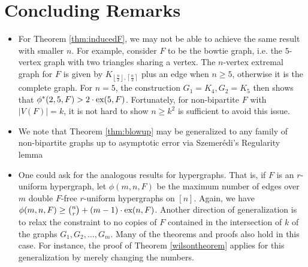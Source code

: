 \documentclass[12pt]{article}
\newcommand*{\ex}{\textnormal{ex}}
\begin{document}
\section{Concluding Remarks}

\begin{itemize}
  \item For Theorem \ref{thm:inducedF}, we may not be able to achieve the same result with smaller $n$. For example, consider $F$ to be the bowtie graph, i.e. the $5$-vertex graph with two triangles sharing a vertex. The $n$-vertex extremal graph for $F$ is given by $K_{\left\lfloor\frac{n}{2}\right\rfloor, \left\lceil\frac{n}{2}\right\rceil}$ plus an edge when $n \geq 5$, otherwise it is the complete graph. For $n = 5$, the construction $G_1 = K_{4}, G_2 = K_5$ then shows that $\phi^*(2, 5, F) > 2 \cdot \ex(5, F)$. Fortunately, for non-bipartite $F$ with $|V(F)| = k$, it is not hard to show $n \geq k^2$ is sufficient to avoid this issue.
  
  \item We note that Theorem \ref{thm:blowup} may be generalized to any family of non-bipartite graphs up to asymptotic error via Szemer\'{e}di's Regularity lemma
  \item One could ask for the analogous results for hypergraphs. That is, if $F$ is an $r$-uniform hypergraph, let $\phi(m, n, F)$ be the maximum number of edges over $m$ double $F$-free $r$-uniform hypergraphs on $[n]$. Again, we have $\phi(m, n, F) \geq \binom{n}{r} + (m - 1) \cdot \ex(n, F)$. Another direction of generalization is to relax the constraint to no copies of $F$ contained in the intersection of $k$ of the graphs $G_1, G_2, \ldots, G_m$. Many of the theorems and proofs also hold in this case. For instance, the proof of Theorem \ref{wilsontheorem} applies for this generalization by merely changing the numbers.
\end{itemize}



\end{document}
